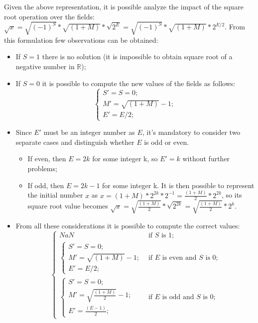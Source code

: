 \documentclass[paper=letter, fontsize=12pt]{article}
\begin{document}
Given the above representation, it is possible analyze the impact of the square root operation over the fields: \(\sqrt{x} = \sqrt{(-1)^S} * \sqrt{(1+M)} * \sqrt{2^E} = \sqrt{(-1)^S} * \sqrt{(1+M)} * 2^{E/2}\). From this formulation few observations can be obtained:
\begin{itemize}
    \item If \(S = 1\) there is no solution (it is impossible to obtain square root of a negative number in \(\mathbb{R}\));
    \item If \(S = 0\) it is possible to compute the new values of the fields as follows:
    \begin{equation}
        \label{eq:general}
        \begin{cases}
        S' = S = 0;\\
        M' = \sqrt{(1+M)} - 1;\\
        E' = E/2;\end{cases}
    \end{equation}
    \item Since \(E'\) must be an integer number as \(E\), it's mandatory to consider two separate cases and distinguish whether \(E\) is odd or even. 
    \begin{itemize}
        \item If even, then \(E = 2k\) for some integer k, so \(E' = k\) without further problems;
        \item If odd, then \(E = 2k - 1\) for some integer k. It is then possible to represent the initial number \(x\) as \(x = (1+M) * 2^{2k} * 2^{-1} = \frac{(1+M)}{2} * 2^{2k}\), so its square root value becomes \(\sqrt{x} = \sqrt{\frac{(1+M)}{2}} * \sqrt{2^{2k}} = \sqrt{\frac{(1+M)}{2}} * 2^{k}\).
    \end{itemize}
    \item From all these considerations it is possible to compute the correct values:\\
    \begin{equation}
        \label{eq:specific}
        \begin{cases}
            NaN & \mbox{if }S\mbox{ is 1;}\\[2mm]
            \begin{cases}
                S' = S = 0;\\
                M' = \sqrt{(1+M)} - 1;\\
                E' = E/2;
            \end{cases} & \mbox{if }E\mbox{ is even and }S\mbox{ is 0;}\\
            \begin{cases}
                S' = S = 0;\\
                M' = \sqrt{\frac{(1+M)}{2}} - 1;\\
                E' = \frac{(E - 1)}{2};
            \end{cases} & \mbox{if }E\mbox{ is odd and }S\mbox{ is 0;}
        \end{cases}
    \end{equation}
\end{itemize}
\end{document}
